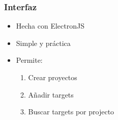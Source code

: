 \begin{frame}[label=interfaz]
    \frametitle{Interfaz}
    \begin{itemize}
        \item Hecha con ElectronJS
        \item Simple y práctica
        \item Permite:
        \begin{enumerate}
            \item Crear proyectos
            \item Añadir targets
            \item Buscar targets por projecto
        \end{enumerate} 
    \end{itemize}
    
\end{frame}